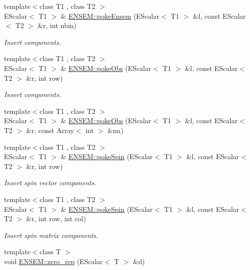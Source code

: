 \begin{DoxyCompactItemize}
\item 
{\footnotesize template$<$class T1 , class T2 $>$ }\\E\+Scalar$<$ T1 $>$ \& \mbox{\hyperlink{group__escalar_ga9528137f2a0461bf8dc2e6825f00464f}{E\+N\+S\+E\+M\+::poke\+Ensem}} (E\+Scalar$<$ T1 $>$ \&l, const E\+Scalar$<$ T2 $>$ \&r, int nbin)
\begin{DoxyCompactList}\small\item\em Insert components. \end{DoxyCompactList}\item 
{\footnotesize template$<$class T1 , class T2 $>$ }\\E\+Scalar$<$ T1 $>$ \& \mbox{\hyperlink{group__escalar_ga635de79045bc1565a78ea94b9ff967fb}{E\+N\+S\+E\+M\+::poke\+Obs}} (E\+Scalar$<$ T1 $>$ \&l, const E\+Scalar$<$ T2 $>$ \&r, int row)
\begin{DoxyCompactList}\small\item\em Insert components. \end{DoxyCompactList}\item 
{\footnotesize template$<$class T1 , class T2 $>$ }\\E\+Scalar$<$ T1 $>$ \& \mbox{\hyperlink{group__escalar_gad25640d827b75330c6d3f288290866fd}{E\+N\+S\+E\+M\+::poke\+Obs}} (E\+Scalar$<$ T1 $>$ \&l, const E\+Scalar$<$ T2 $>$ \&r, const Array$<$ int $>$ \&nn)
\item 
{\footnotesize template$<$class T1 , class T2 $>$ }\\E\+Scalar$<$ T1 $>$ \& \mbox{\hyperlink{group__escalar_gae8b2f2d3c5fedfb458392f11d78f2c88}{E\+N\+S\+E\+M\+::poke\+Spin}} (E\+Scalar$<$ T1 $>$ \&l, const E\+Scalar$<$ T2 $>$ \&r, int row)
\begin{DoxyCompactList}\small\item\em Insert spin vector components. \end{DoxyCompactList}\item 
{\footnotesize template$<$class T1 , class T2 $>$ }\\E\+Scalar$<$ T1 $>$ \& \mbox{\hyperlink{group__escalar_ga7f41ec60f3cfb7ed2f965af5b8a81132}{E\+N\+S\+E\+M\+::poke\+Spin}} (E\+Scalar$<$ T1 $>$ \&l, const E\+Scalar$<$ T2 $>$ \&r, int row, int col)
\begin{DoxyCompactList}\small\item\em Insert spin matrix components. \end{DoxyCompactList}\item 
{\footnotesize template$<$class T $>$ }\\void \mbox{\hyperlink{group__escalar_gacea96299b1b52d3a75cdb109c3b03b05}{E\+N\+S\+E\+M\+::zero\+\_\+rep}} (E\+Scalar$<$ T $>$ \&d)

\end{DoxyCompactItemize}
